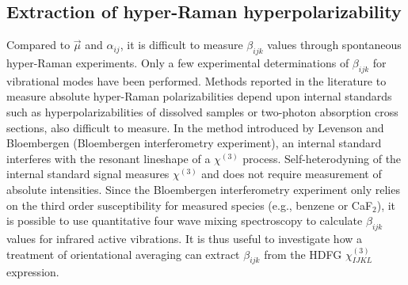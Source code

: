 \documentclass[aip, jcp, reprint, onecolumn, nofootinbib]{revtex4-2}
\begin{document}
\subsection{Extraction of hyper-Raman hyperpolarizability}

Compared to $\vec{\mu}$ and $\alpha_{ij}$, it is difficult to measure $\beta_{ijk}$ values through spontaneous hyper-Raman experiments.\cite{Kelley2010}
Only a few experimental determinations of $\beta_{ijk}$ for vibrational modes have been performed.\cite{Xu1997, Shoute2005, Kelley2010}
Methods reported in the literature to measure absolute hyper-Raman polarizabilities depend upon internal standards such as hyperpolarizabilities of dissolved samples or two-photon absorption cross sections, also difficult to measure. \cite{Kelley2010} 
In the method introduced by Levenson and Bloembergen (Bloembergen interferometry experiment), an internal standard interferes with the resonant lineshape of a $\chi^{(3)}$ process. \cite{Levenson1974_1, Levenson1974_2}
Self-heterodyning of the internal standard signal measures $\chi^{(3)}$ and does not require measurement of absolute intensities. 
Since the Bloembergen interferometry experiment only relies on the third order susceptibility for measured species (e.g., benzene or CaF$_2$),\cite{Levenson1974_2} it is possible to use quantitative four wave mixing spectroscopy to calculate $\beta_{ijk}$ values for infrared active vibrations.
It is thus useful to investigate how a treatment of orientational averaging can extract $\beta_{ijk}$ from the HDFG $\chi^{(3)}_{IJKL}$ expression.
\end{document}
